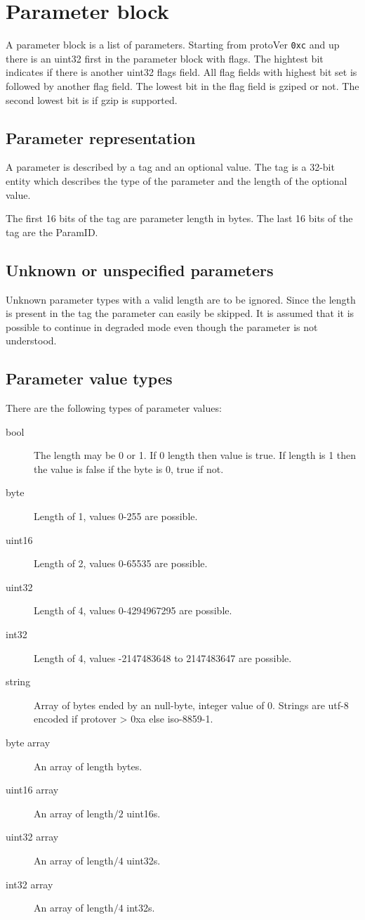 \documentclass[a4paper]{article}
\begin{document}
\section{Parameter block}

A parameter block is a list of parameters.
Starting from protoVer {\tt 0xc} and up there is an uint32 first in the 
parameter block with flags. The hightest bit indicates if there is another 
uint32 flags field. All flag fields with highest bit set is followed by another flag field. The lowest bit in the flag field is gziped or not. The second lowest bit is if gzip is supported.

\subsection{Parameter representation}

A parameter is described by a tag and an optional value. The 
tag is a 32-bit entity which describes the type of the parameter
and the length of the optional value.

The first 16 bits of the tag are parameter length in bytes.
The last 16 bits of the tag are the ParamID. 


\subsection{Unknown or unspecified parameters}

Unknown parameter types with a valid length are to be ignored.
Since the length is present in the tag the parameter can easily 
be skipped. It is assumed that it is possible to continue in 
degraded mode even though the parameter is not understood.


\subsection{Parameter value types}

There are the following types of parameter values:

\begin{description}
\item[bool] The length may be 0 or 1. If 0 length then value is true. 
  If length is 1 then the value is false if the byte is 0, true if not.
\item[byte] Length of 1, values 0-255 are possible.
\item[uint16] Length of 2, values 0-65535 are possible.
\item[uint32] Length of 4, values 0-4294967295 are possible.
\item[int32] Length of 4, values -2147483648 to 2147483647 are possible.
\item[string] Array of bytes ended by an null-byte, integer value of 0.
  Strings are utf-8 encoded if protover > 0xa else iso-8859-1.
\item[byte array] An array of length bytes.
\item[uint16 array] An array of length$/2$ uint16s.
\item[uint32 array] An array of length$/4$ uint32s.
\item[int32 array]  An array of length$/4$ int32s.
\end{description}
\end{document}
